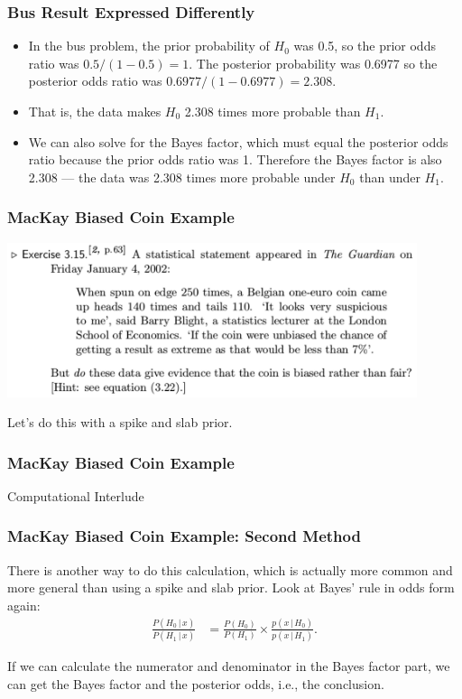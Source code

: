\documentclass{beamer}
\newcommand{\given}{\,|\,}
\begin{document}
\begin{frame}
\frametitle{Bus Result Expressed Differently}
\begin{itemize}
\item In the bus problem, the prior probability of $H_0$ was 0.5, so the prior
odds ratio was $0.5/(1 - 0.5) = 1$. The posterior probability was
0.6977 so the posterior odds ratio was $0.6977/(1 - 0.6977)=2.308$.\pause
\item That is, the data makes $H_0$ 2.308 times more probable than $H_1$.\pause
\item We can also solve for the Bayes factor, which must equal the posterior
odds ratio because the prior odds ratio was 1. Therefore the Bayes factor
is also 2.308 --- the data was 2.308 times more probable under $H_0$ than
under $H_1$.
\end{itemize}


\end{frame}


\begin{frame}
\frametitle{MacKay Biased Coin Example}

\begin{center}
\includegraphics[width=0.9\textwidth]{images/mackay_coin.png}
\end{center}

Let's do this with a spike and slab prior.

\end{frame}

\begin{frame}
\frametitle{MacKay Biased Coin Example}

\centering
Computational Interlude

\end{frame}



\begin{frame}
\frametitle{MacKay Biased Coin Example: Second Method}
There is another way to do this calculation, which is actually more common
and more general than using a spike and slab prior. Look at Bayes' rule
in odds form again:
\begin{align}
\frac{P(H_0 \given x)}{P(H_1 \given x)}
    &= \frac{P(H_0)}{P(H_1)} \times \frac{p(x \given H_0)}{p(x \given H_1)}.
\end{align}
\pause

If we can calculate the numerator and denominator in the Bayes factor part,
we can get the Bayes factor and the posterior odds, i.e., the conclusion.
\end{frame}
\end{document}
